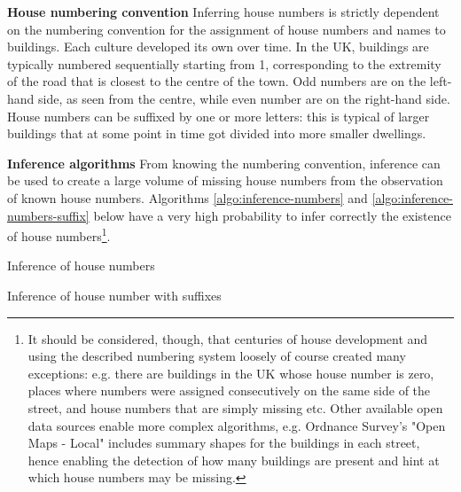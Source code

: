 \textbf{House numbering convention} Inferring house numbers is strictly dependent on the numbering convention for the assignment of house numbers and names to buildings. Each culture developed its own over time. In the UK, buildings are typically numbered sequentially starting from 1, corresponding to the extremity of the road that is closest to the centre of the town. Odd numbers are on the left-hand side, as seen from the centre, while even number are on the right-hand side. House numbers can be suffixed by one or more letters: this is typical of larger buildings that at some point in time got divided into more smaller dwellings. 
        
\textbf{Inference algorithms} From knowing the numbering convention, inference can be used to create a large volume of missing house numbers from the observation of known house numbers. Algorithms \ref{algo:inference-numbers} and \ref{algo:inference-numbers-suffix} below have a very high probability to infer correctly the existence of house numbers\footnote{It should be considered, though, that centuries of house development and using the described numbering system loosely of course created many exceptions: e.g. there are buildings in the UK whose house number is zero, places where numbers were assigned consecutively on the same side of the street, and house numbers that are simply missing etc. Other available open data sources enable more complex algorithms, e.g. Ordnance Survey's "Open Maps - Local" includes summary shapes for the buildings in each street, hence enabling the detection of how many buildings are present and hint at which house numbers may be missing.}. 

\vspace{5mm}

\begin{algorithm}[H]
    \caption{Inference of house numbers}
    \label{algo:inference-numbers}
\end{algorithm}

\vspace{5mm}

\begin{algorithm}[H]
    \caption{Inference of house number with suffixes}
    \label{algo:inference-numbers-suffix}
\end{algorithm}

